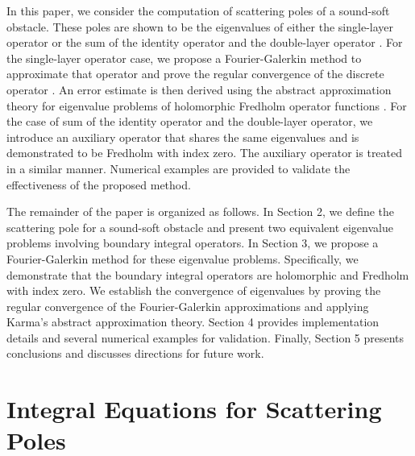 \documentclass{article}
\begin{document}
	
	In this paper, we consider the computation of scattering poles of a sound-soft obstacle. These poles are shown to be the eigenvalues of either the single-layer operator or the sum of the identity operator and the double-layer operator \cite{Taylor1996}.
		For the single-layer operator case,  we propose a Fourier-Galerkin method to approximate that operator and prove the regular convergence of the discrete operator \cite{GongSun2023ETNA}. An error estimate is then derived using the abstract approximation theory for eigenvalue problems of holomorphic Fredholm operator functions \cite{karma1996a, karma1996b}. 
		For the case of sum of the identity operator and the double-layer operator, we introduce an auxiliary operator that shares the same eigenvalues and is demonstrated to be Fredholm with index zero. The auxiliary operator is treated in a similar manner. 
	    Numerical examples are provided to validate the effectiveness of the proposed method. 
	
	The remainder of the paper is organized as follows. In Section 2, we define the scattering pole for a sound-soft obstacle and present two equivalent eigenvalue problems involving boundary integral operators. In Section 3, we propose a Fourier-Galerkin method for these eigenvalue problems. Specifically, we demonstrate that the boundary integral operators are holomorphic and Fredholm with index zero. We establish the convergence of eigenvalues by proving the regular convergence of the Fourier-Galerkin approximations and applying Karma's abstract approximation theory. Section 4 provides implementation details and several numerical examples for validation. Finally, Section 5 presents conclusions and discusses directions for future work.
	
	
	
	
	\section{Integral Equations for Scattering Poles}
	
\end{document}
